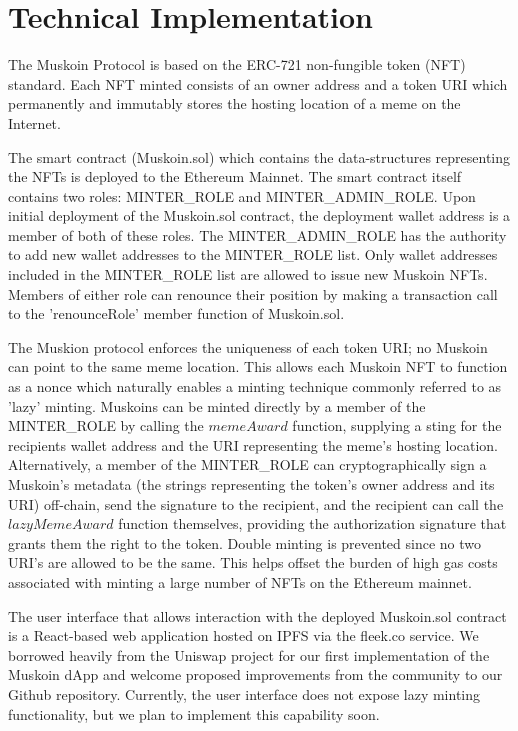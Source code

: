 \documentclass{article}
\begin{document}
\section{Technical Implementation}
The Muskoin Protocol is based on the ERC-721 non-fungible token (NFT) standard. Each NFT minted consists of an owner address and a token URI which permanently and immutably stores the hosting location of a meme on the Internet.

The smart contract (Muskoin.sol) which contains the data-structures representing the NFTs is deployed to the Ethereum Mainnet. The smart contract itself contains two roles: MINTER\_ROLE and MINTER\_ADMIN\_ROLE. Upon initial deployment of the Muskoin.sol contract, the deployment wallet address is a member of both of these roles. The MINTER\_ADMIN\_ROLE has the authority to add new wallet addresses to the MINTER\_ROLE list. Only wallet addresses included in the MINTER\_ROLE list are allowed to issue new Muskoin NFTs. Members of either role can renounce their position by making a transaction call to the 'renounceRole' member function of Muskoin.sol. 

The Muskion protocol enforces the uniqueness of each token URI; no Muskoin can point to the same meme location. This allows each Muskoin NFT to function as a nonce which naturally enables a minting technique commonly referred to as 'lazy' minting. Muskoins can be minted directly by a member of the MINTER\_ROLE by calling the $memeAward$ function, supplying a sting for the recipients wallet address and the URI representing the meme's hosting location. Alternatively, a member of the MINTER\_ROLE can cryptographically sign a Muskoin's metadata (the strings representing the token's owner address and its URI) off-chain, send the signature to the recipient, and the recipient can call the $lazyMemeAward$ function themselves, providing the authorization signature that grants them the right to the token. Double minting is prevented since no two URI's are allowed to be the same. This helps offset the burden of high gas costs associated with minting a large number of NFTs on the Ethereum mainnet. 

The user interface that allows interaction with the deployed Muskoin.sol contract is a React-based web application hosted on IPFS via the fleek.co service. We borrowed heavily from the Uniswap project for our first implementation of the Muskoin dApp and welcome proposed improvements from the community to our Github repository. Currently, the user interface does not expose lazy minting functionality, but we plan to implement this capability soon.
\end{document}
